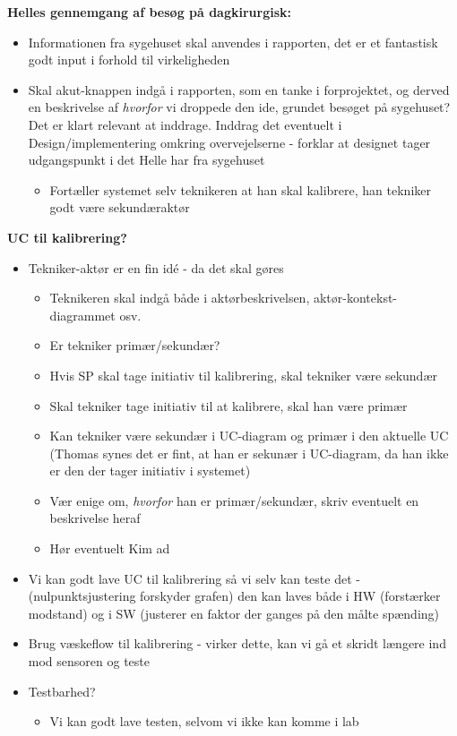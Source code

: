 \documentclass[a4paper,11pt,oneside]{memoir}
\begin{document}
\textbf{Helles gennemgang af besøg på dagkirurgisk:}
\begin{itemize}
\item Informationen fra sygehuset skal anvendes i rapporten, det er et fantastisk godt input i forhold til virkeligheden
\item Skal akut-knappen indgå i rapporten, som en tanke i forprojektet, og derved en beskrivelse af \textit{hvorfor} vi droppede den ide, grundet besøget på sygehuset? Det er klart relevant at inddrage. Inddrag det eventuelt i Design/implementering omkring overvejelserne - forklar at designet tager udgangspunkt i det Helle har fra sygehuset 
\begin{itemize}
\item Fortæller systemet selv teknikeren at han skal kalibrere, han tekniker godt være sekundæraktør
\end{itemize}
\end{itemize}

\textbf{UC til kalibrering?}
\begin{itemize}
\item Tekniker-aktør er en fin idé - da det skal gøres
\begin{itemize}
\item Teknikeren skal indgå både i aktørbeskrivelsen, aktør-kontekst-diagrammet osv. 
\item Er tekniker primær/sekundær? 
\item Hvis SP skal tage initiativ til kalibrering, skal tekniker være sekundær
\item Skal tekniker tage initiativ til at kalibrere, skal han være primær
\item Kan tekniker være sekundær i UC-diagram og primær i den aktuelle UC (Thomas synes det er fint, at han er sekunær i UC-diagram, da han ikke er den der tager initiativ i systemet)
\item Vær enige om, \textit{hvorfor} han er primær/sekundær, skriv eventuelt en beskrivelse heraf
\item Hør eventuelt Kim ad 
\end{itemize}
\item Vi kan godt lave UC til kalibrering så vi selv kan teste det - (nulpunktsjustering forskyder grafen) den kan laves både i HW (forstærker modstand) og i SW (justerer en faktor der ganges på den målte spænding)
\item Brug væskeflow til kalibrering - virker dette, kan vi gå et skridt længere ind mod sensoren og teste
\item Testbarhed?
\begin{itemize}
\item Vi kan godt lave testen, selvom vi ikke kan komme i lab
\end{itemize}
\end{itemize}
\end{document}
